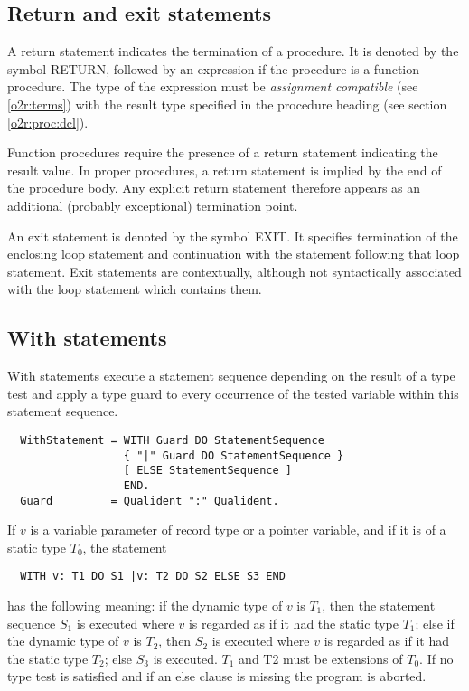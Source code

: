 \subsection{Return and exit statements}\label{o2r:return}

A return statement indicates the termination of a procedure. It is
denoted by the symbol RETURN, followed by an expression if the procedure
is a function procedure. The type of the expression must be {\em assignment
compatible} (see \ref{o2r:terms}) with the result type
specified in the procedure heading (see section \ref{o2r:proc:dcl}).

Function procedures require the presence of a return statement indicating
the result value. In proper procedures, a return statement is implied
by the end of the procedure body. Any explicit return statement therefore
appears as an additional (probably exceptional) termination point.

An exit statement is denoted by the symbol EXIT. It specifies termination
of the enclosing loop statement and continuation with the statement
following that loop statement. Exit statements are contextually, although
not syntactically associated with the loop statement which contains
them.

\subsection{With statements}

With statements execute a statement sequence depending on the result
of a type test and apply a type guard to every occurrence of the tested
variable within this statement sequence.
{\BNFsize
\begin{verbatim}
  WithStatement = WITH Guard DO StatementSequence
                  { "|" Guard DO StatementSequence }
                  [ ELSE StatementSequence ]
                  END.
  Guard         = Qualident ":" Qualident.
\end{verbatim}}
If $v$ is a variable parameter of record type or a pointer variable,
and if it is of a static type $T_0$, the statement
\begin{verbatim}
  WITH v: T1 DO S1 |v: T2 DO S2 ELSE S3 END
\end{verbatim}
has the following meaning: if the dynamic type of $v$ is $T_1$, then the
statement sequence $S_1$ is executed where $v$ is regarded as if it had
the static type $T_1$; else if the dynamic type of $v$ is $T_2$, then $S_2$ is
executed where $v$ is regarded as if it had the static type $T_2$; else
$S_3$ is executed. $T_1$ and T2 must be extensions of $T_0$. If no type test
is satisfied and if an else clause is missing the program is aborted.

